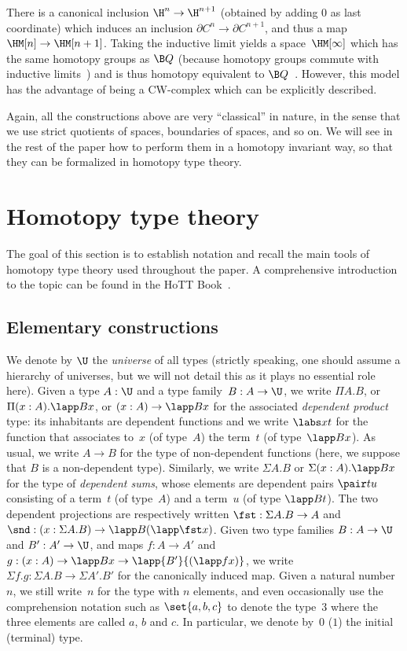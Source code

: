 \documentclass[a4paper]{article}
\newcommand{\citep}{\cite}
\begin{document}
There is a canonical inclusion $\H^n\to\H^{n+1}$ (obtained by adding $0$ as last coordinate) which induces an inclusion $\partial C^n\to\partial C^{n+1}$, and thus a map $\HM[n]\to\HM[n+1]$. Taking the inductive limit yields a space $\HM[\infty]$ which has the same homotopy groups as $\B Q$ (because homotopy groups commute with inductive limits~\cite[Chapter 9, Section 4]{may}) and is thus homotopy equivalent to $\B Q$~\cite[Theorem 1B.8]{hatcher}. However, this model has the advantage of being a CW-complex which can be explicitly described.

Again, all the constructions above are very ``classical'' in nature, in the sense that we use strict quotients of spaces, boundaries of spaces, and so on. We will see in the rest of the paper how to perform them in a homotopy invariant way, so that they can be formalized in homotopy type theory.
\section{Homotopy type theory}
\label{hott}
The goal of this section is to establish notation and recall the main tools of homotopy type theory used throughout the paper. A comprehensive introduction to the topic can be found in the HoTT Book~\citep{hottbook}.

\subsection{Elementary constructions}
We denote by $\U$ the \emph{universe} of all types (strictly speaking, one should assume a hierarchy of universes, but we will not detail this as it plays no essential role here). Given a type $A:\U$ and a type family~$B:A\to\U$, we write $\Pi A.B$, or $\Pi(x:A).\lapp Bx$, or $(x:A)\to\lapp Bx$ for the associated \emph{dependent product} type: its inhabitants are dependent functions and we write $\labs xt$ for the function that associates to~$x$ (of type~$A$) the term~$t$ (of type~$\lapp Bx$). As usual, we write $A\to B$ for the type of non-dependent functions (here, we suppose that $B$ is a non-dependent type). Similarly, we write $\Sigma A.B$ or $\Sigma(x:A).\lapp Bx$ for the type of \emph{dependent sums}, whose elements are dependent pairs $\pair tu$ consisting of a term~$t$ (of type~$A$) and a term~$u$ (of type $\lapp Bt$). The two dependent projections are respectively written $\fst:\Sigma A.B\to A$ and $\snd:(x:\Sigma A.B)\to\lapp B{(\lapp\fst x)}$. Given two type families $B:A\to\U$ and $B':A'\to\U$, and maps $f:A\to A'$ and $g:(x:A)\to\lapp Bx\to\lapp{B'}{(\lapp fx)}$, we write $\Sigma f.g:\Sigma A.B\to\Sigma A'.B'$ for the canonically induced map.
%
Given a natural number~$n$, we still write~$n$ for the type with $n$ elements, and even occasionally use the comprehension notation such as $\set{a,b,c}$ to denote the type~$3$ where the three elements are called $a$, $b$ and $c$. In particular, we denote by~$0$ (\resp $1$) the initial (\resp terminal) type.
\end{document}
